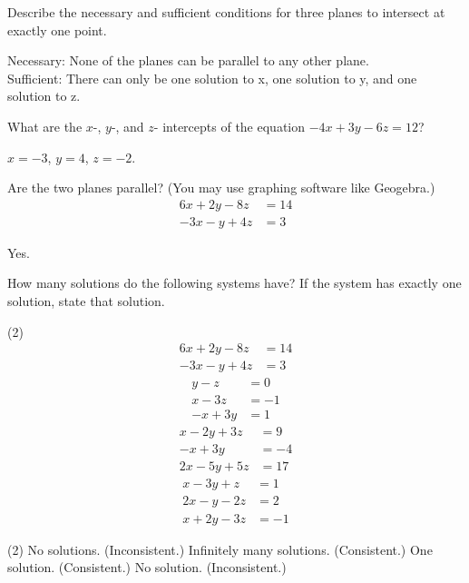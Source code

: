 \documentclass[12pt,fleqn]{book}
\newcommand{\prb}[1]{\begin{Exercise}#1\end{Exercise}}
\newcommand{\sol}[1]{\begin{Answer}#1\end{Answer}}
\begin{document}
\prb{
Describe the necessary and sufficient conditions for three planes to intersect at exactly one point.
\\[8em]
}
\sol{Necessary: None of the planes can be parallel to any other plane. \\
Sufficient: There can only be one solution to x, one solution to y, and one solution to z.}
\prb{
What are the $x$-, $y$-, and $z$- intercepts of the equation $-4x+3y-6z=12$?\\[4em]
}
\sol{$x=-3$, $y=4$, $z=-2$.}
\prb{Are the two planes parallel? (You may use graphing software like Geogebra.)
\begin{align*}
	6x+2y-8z&=14\\
	-3x-y+4z&=3
\end{align*}
\vspace{1in}
}
\sol{Yes.}
\prb{How many solutions do the following systems have?  If the system has exactly one solution, state that solution.
\begin{tasks}(2)
	\task \vspace{-2.4em}
	\begin{align*}
		6x+2y-8z&=14\\
		-3x-y+4z&=3
	\end{align*}
	\task \vspace{-2.4em}
	\begin{align*}
		y-z&=0\\
		x-3z&=-1\\
		-x+3y&=1
	\end{align*}
	\task \vspace{-2.4em}
	\begin{align*}
		x-2y+3z&=9\\
		-x+3y &= -4\\
		2x-5y+5z&=17
	\end{align*}
	\task \vspace{-2.4em}
	\begin{align*}
		x-3y+z&=1\\
		2x-y-2z &=2\\
		x+2y-3z&=-1
	\end{align*}
	\end{tasks}
}
\sol{
\begin{tasks}(2)
	\task No solutions. (Inconsistent.)
	\task Infinitely many solutions. (Consistent.)
	\task One solution. (Consistent.)
	\task No solution. (Inconsistent.)
\end{tasks}\clearpage
}
\end{document}
